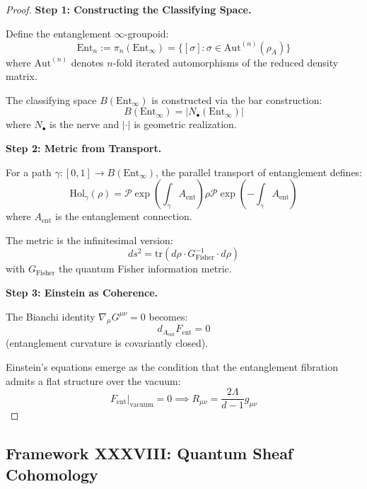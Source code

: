 \documentclass[12pt,a4paper]{article}
\begin{document}
\begin{proof}
\textbf{Step 1: Constructing the Classifying Space.}

Define the entanglement $\infty$-groupoid:
\begin{equation}
\text{Ent}_n := \pi_n(\text{Ent}_\infty) = \{[\sigma] : \sigma \in \text{Aut}^{(n)}(\rho_A)\}
\end{equation}
where $\text{Aut}^{(n)}$ denotes $n$-fold iterated automorphisms of the reduced density matrix.

The classifying space $B(\text{Ent}_\infty)$ is constructed via the bar construction:
\begin{equation}
B(\text{Ent}_\infty) = |N_\bullet(\text{Ent}_\infty)|
\end{equation}
where $N_\bullet$ is the nerve and $|\cdot|$ is geometric realization.

\textbf{Step 2: Metric from Transport.}

For a path $\gamma: [0,1] \to B(\text{Ent}_\infty)$, the parallel transport of entanglement defines:
\begin{equation}
\text{Hol}_\gamma(\rho) = \mathcal{P}\exp\left(\int_\gamma A_{\text{ent}}\right) \rho \mathcal{P}\exp\left(-\int_\gamma A_{\text{ent}}\right)
\end{equation}
where $A_{\text{ent}}$ is the entanglement connection.

The metric is the infinitesimal version:
\begin{equation}
ds^2 = \text{tr}(d\rho \cdot G^{-1}_{\text{Fisher}} \cdot d\rho)
\end{equation}
with $G_{\text{Fisher}}$ the quantum Fisher information metric.

\textbf{Step 3: Einstein as Coherence.}

The Bianchi identity $\nabla_\mu G^{\mu\nu} = 0$ becomes:
\begin{equation}
d_{A_{\text{ent}}} F_{\text{ent}} = 0
\end{equation}
(entanglement curvature is covariantly closed).

Einstein's equations emerge as the condition that the entanglement fibration admits a flat structure over the vacuum:
\begin{equation}
F_{\text{ent}}|_{\text{vacuum}} = 0 \implies R_{\mu\nu} = \frac{2\Lambda}{d-1} g_{\mu\nu}
\end{equation}
\end{proof}

\subsection{Framework XXXVIII: Quantum Sheaf Cohomology}
\end{document}
